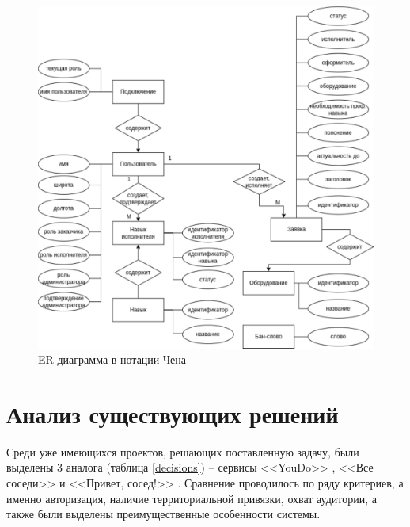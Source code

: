 \begin{figure}[H]
	\begin{center}
		\includegraphics[page=1,scale=0.8]{assets/ER-Chen.pdf}
	\end{center}
	\caption{ER-диаграмма в нотации Чена}
	\label{er-chen}
\end{figure}

\section{Анализ существующих решений}

Среди уже имеющихся проектов, решающих поставленную задачу, были выделены 3 аналога (таблица \ref{decisions}) -- сервисы <<YouDo>> \cite{youdo}, <<Все соседи>> \cite{all_neighbour} и <<Привет, сосед!>> \cite{hello_neighbour}. Сравнение проводилось по ряду критериев, а именно авторизация, наличие территориальной привязки, охват аудитории, а также были выделены преимущественные особенности системы.

